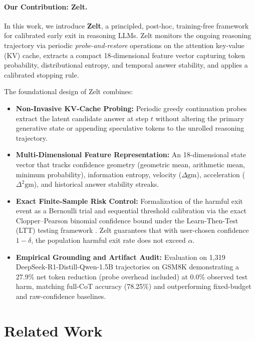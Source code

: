 \documentclass[11pt]{article}
\begin{document}
\paragraph{Our Contribution: Zelt.}
In this work, we introduce \textbf{Zelt}, a principled, post-hoc, training-free framework for calibrated early exit in reasoning LLMs. Zelt monitors the ongoing reasoning trajectory via periodic \emph{probe-and-restore} operations on the attention key-value (KV) cache, extracts a compact 18-dimensional feature vector capturing token probability, distributional entropy, and temporal answer stability, and applies a calibrated stopping rule.

The foundational design of Zelt combines:
\begin{itemize}
  \item \textbf{Non-Invasive KV-Cache Probing:} Periodic greedy continuation probes extract the latent candidate answer at step $t$ without altering the primary generative state or appending speculative tokens to the unrolled reasoning trajectory.
  \item \textbf{Multi-Dimensional Feature Representation:} An 18-dimensional state vector that tracks confidence geometry (geometric mean, arithmetic mean, minimum probability), information entropy, velocity ($\Delta \mathrm{gm}$), acceleration ($\Delta^2 \mathrm{gm}$), and historical answer stability streaks.
  \item \textbf{Exact Finite-Sample Risk Control:} Formalization of the harmful exit event as a Bernoulli trial and sequential threshold calibration via the exact Clopper--Pearson binomial confidence bound \citep{clopper1934use} under the Learn-Then-Test (LTT) testing framework \citep{angelopoulos2021learntest}. Zelt guarantees that with user-chosen confidence $1-\delta$, the population harmful exit rate does not exceed $\alpha$.
  \item \textbf{Empirical Grounding and Artifact Audit:} Evaluation on 1{,}319 DeepSeek-R1-Distill-Qwen-1.5B trajectories on GSM8K demonstrating a 27.9\% net token reduction (probe overhead included) at 0.0\% observed test harm, matching full-CoT accuracy (78.25\%) and outperforming fixed-budget and raw-confidence baselines.
\end{itemize}

\section{Related Work}
\label{sec:related}
\end{document}
